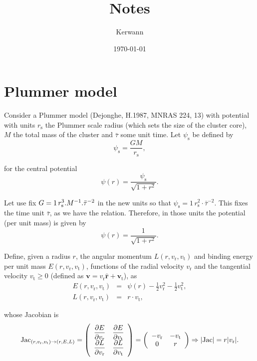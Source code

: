 \documentclass[11pt]{article}
\author{Kerwann}
\date{\today}
\title{Notes}
\newcommand{\rs}{\mathrm{s}}
\newcommand{\rt}{\mathrm{t}}
\newcommand{\rr}{\mathrm{r}}
\newcommand{\psis}{\psi_{\rs}}
\newcommand{\vr}{v_{\rr}}
\newcommand{\vt}{v_{\rt}}
\newcommand{\bv}{\boldsymbol{v}}
\newcommand{\bvt}{\boldsymbol{\vt}}
\newcommand{\br}{\boldsymbol{r}}
\newcommand{\hr}{\hat{\br}}
\begin{document}
\maketitle

\tableofcontents

\section{Plummer model}
\label{sec:Plummer}

  Consider a Plummer model (Dejonghe, H.1987, MNRAS 224, 13) with potential
with units $r_{\rs}$ the Plummer scale radius (which sets the size
of the cluster core), $M$ the total mass of the cluster and $\bar{\tau}$
some unit time. Let $\psis$ be defined by
\begin{equation}
\psis = \frac{G M}{r_{\rs}} ,
\label{eq:def_psi_s}
\end{equation}

for the central potential
\begin{equation}
\psi(r)=\frac{\psis}{\sqrt{1+r^{2}}} .
\label{eq:def_potential}
\end{equation}

Let use fix $G=1\,r_{\rs}^{3}.M^{-1}.{\rm \bar{\tau}^{-2}}$ in the
new units so that $\psis=1\,r_{\rs}^{2}\cdot\bar{\tau}^{-2}$. This
fixes the time unit $\bar{\tau}$, as we have the relation. Therefore, in
those units the potential (per unit mass) is given by
\begin{equation}
\psi(r)=\frac{1}{\sqrt{1+r^{2}}} .
\label{eq:def_potential_new_units}
\end{equation}

Define, given a radius $r$, the angular momentum $L(r,\vr,\vt)$
and binding energy per unit mass $E(r,\vr,\vt)$, functions of
the radial velocity $\vr$ and the tangential velocity $\vt\geq 0$
(defined as $\bv=\vr \hr + \bvt$),
as
\begin{equation}
\begin{array}{ccl}
E(r,\vr,\vt) & = & \psi(r)-\frac{1}{2} \vr^{2}-\frac{1}{2}\vt^{2} ,\\
L(r,\vr,\vt) & = & r \cdot \vt ,
\end{array}
\label{eq:v_to_E_L}
\end{equation}

whose Jacobian is
\begin{equation}
{\rm Jac}_{(r,\vr,\vt)\rightarrow(r,E,L)}=\left(\begin{array}{cc}
\displaystyle{\frac{\partial E}{\partial \vr}} & \displaystyle{\frac{\partial E}{\partial \vt}}\\
\displaystyle{\frac{\partial L}{\partial \vr}} & \displaystyle{\frac{\partial L}{\partial \vt}}
\end{array}\right)=\left(\begin{array}{cc}
-\vr & -\vt\\
0 & r
\end{array}\right)\Rightarrow|{\rm Jac}|=r|\vr| .
\label{eq:Jacobian}
  \end{equation}
\end{document}
